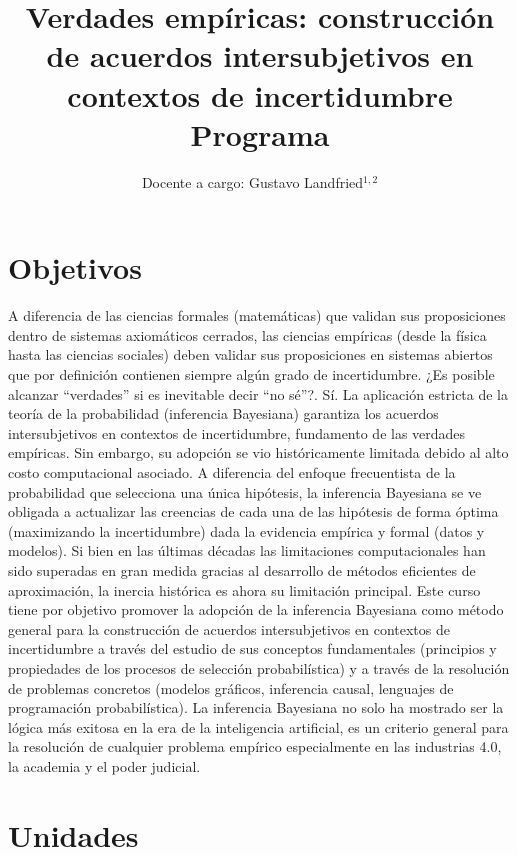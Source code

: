 \documentclass[10pt]{article}
\title{\huge Verdades empíricas: construcción de acuerdos intersubjetivos en contextos de incertidumbre  \\[0.4cm]  \LARGE Programa}
\author{Docente a cargo: Gustavo Landfried$^{1,2}$}
\affil{\small 1. Bayes de las Provincias Unidas del Sur }
\affil{\vspace{-0.2cm}\small 2. Laboratorio Pacha Pampas}
\affil[]{Correspondencia: \texttt{glandfried@dc.uba.ar}, \texttt{bayesdelsur@gmail.com}}
\begin{document}
\maketitle

\section{Objetivos}

A diferencia de las ciencias formales (matemáticas) que validan sus proposiciones dentro de sistemas axiomáticos cerrados, las ciencias empíricas (desde la física hasta las ciencias sociales) deben validar sus proposiciones en sistemas abiertos que por definición contienen siempre algún grado de incertidumbre.
¿Es posible alcanzar ``verdades'' si es inevitable decir ``no sé''?.
Sí.
La aplicación estricta de la teoría de la probabilidad (inferencia Bayesiana) garantiza los acuerdos intersubjetivos en contextos de incertidumbre, fundamento de las verdades empíricas. Sin embargo, su adopción se vio históricamente limitada debido al alto costo computacional asociado.
A diferencia del enfoque frecuentista de la probabilidad que selecciona una única hipótesis, la inferencia Bayesiana se ve obligada a actualizar las creencias de cada una de las hipótesis de forma óptima (maximizando la incertidumbre) dada la evidencia empírica y formal (datos y modelos).
Si bien en las últimas décadas las limitaciones computacionales han sido superadas en gran medida gracias al desarrollo de métodos eficientes de aproximación, la inercia histórica es ahora su limitación principal.
Este curso tiene por objetivo promover la adopción de la inferencia Bayesiana como método general para la construcción de acuerdos intersubjetivos en contextos de incertidumbre a través del estudio de sus conceptos fundamentales (principios y propiedades de los procesos de selección probabilística) y a través de la resolución de problemas concretos (modelos gráficos, inferencia causal, lenguajes de programación probabilística). La inferencia Bayesiana no solo ha mostrado ser la lógica más exitosa en la era de la inteligencia artificial, es un criterio general para la resolución de cualquier problema empírico especialmente en las industrias 4.0, la academia y el poder judicial.

\section{Unidades}
\end{document}
